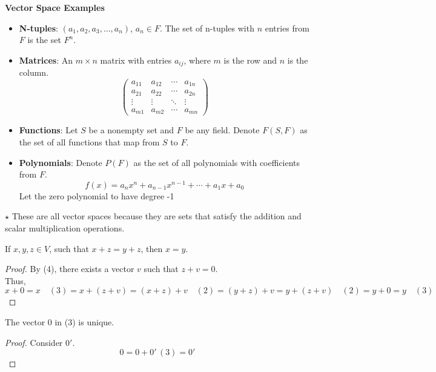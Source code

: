 \documentclass{article}
\begin{document}
 \textbf{Vector Space Examples}
 \begin{itemize}
     \item \textbf{N-tuples}: $(a_1, a_2, a_3, \ldots, a_n)$, $a_n \in F$. The set of n-tuples with $n$ entries from $F$ is the set $F^n$.
     \item \textbf{Matrices}: An $m \times n$ matrix with entries $a_{ij}$, where $m$ is the row and $n$ is the column.\\
     \[
     \begin{pmatrix}
         a_{11} & a_{12} & \cdots & a_{1n} \\
         a_{21} & a_{22} & \cdots & a_{2n} \\
         \vdots & \vdots & \ddots & \vdots \\ 
         a_{m1} & a_{m2} & \cdots & a_{mn}
     \end{pmatrix}
     \]
     \item \textbf{Functions}: Let $S$ be a nonempty set and $F$ be any field. Denote $F(S, F)$ as the set of all functions that map from $S$ to $F$.
     \item \textbf{Polynomials}: Denote $P(F)$ as the set of all polynomials with coefficients from $F$.
     \[
         f(x) = a_nx^n + a_{n-1}x^{n-1} + \cdots + a_1 x + a_0
     \]
     Let the zero polynomial to have degree -1
 \end{itemize}
 
 $\star$ These are all vector spaces because they are sets that satisfy the addition and scalar multiplication operations.
 
 \begin{theorem}
 If $x, y, z \in V$, such that $x + z = y + z$, then $x = y$.
 \end{theorem}
 
 \begin{proof}
     By (4), there exists a vector $v$ such that $z + v = 0$. \\
     Thus,
     \[
     x + 0 = x \quad (3) = x + (z + v) = (x + z) + v \quad (2) = (y + z) + v = y + (z + v) \quad (2) = y + 0 = y \quad (3)
     \]
 \end{proof}
 
 \begin{corollary}
 The vector $0$ in (3) is unique.
 \end{corollary}
 
 \begin{proof}
     Consider $0'$.
     \[
     0 = 0 + 0' \,(3) = 0'
     \]
 \end{proof}
 
 
\end{document}
